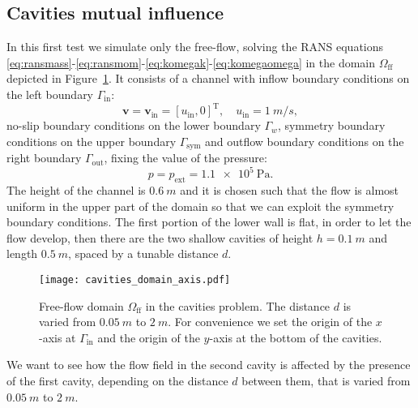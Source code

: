 \subsection{Cavities mutual influence}
In this first test we simulate only the free-flow, solving the RANS equations  \eqref{eq:ransmass}-\eqref{eq:ransmom}-\eqref{eq:komegak}-\eqref{eq:komegaomega} in the domain $\Omega_\text{ff}$ depicted in Figure~\ref{fig:singledomain}. It consists of a channel with inflow boundary 
conditions on the left boundary $\Gamma_\text{in}$:
\begin{equation}
	\mathbf{v} = \mathbf{v}_\text{in} = [u_\text{in}, 0]^\mathrm{T}, \quad u_\text{in} = \SI{1}{m/s},
\end{equation}
no-slip boundary conditions on the lower boundary $\Gamma_w$, symmetry boundary conditions on the upper boundary $\Gamma_\text{sym}$ and outflow boundary conditions on the right boundary $\Gamma_\text{out}$, fixing the value of the pressure:
\begin{equation}
	p = p_\text{ext} = \SI{1.1e5}{\pascal}.
\end{equation}
The height of the channel is $\SI{0.6}{m}$ and it is chosen such that the flow is almost uniform in the upper part of the domain so that we can exploit the symmetry boundary conditions. The first portion of the lower wall is flat, in order to let the flow develop, then there are the two shallow cavities of height $h=\SI{0.1}{m}$ and length $\SI{0.5}{m}$, spaced by a tunable distance $d$.
\begin{figure}[ht]
	\centering
	\texttt{[image: cavities\_domain\_axis.pdf]}
	\caption[Free-flow domain $\Omega_\text{ff}$ in the cavities problem]{Free-flow domain $\Omega_\text{ff}$ in the cavities problem. The distance $d$ is varied from $\SI{0.05}{m}$ to $\SI{2}{m}$. For convenience we set the origin of the $x$-axis at $\Gamma_\text{in}$ and the origin of the $y$-axis at the bottom of the cavities.}
	\label{fig:singledomain}
\end{figure}

We want to see how the flow field in the second cavity is affected by the 
presence of the first cavity, depending on the distance $d$ between them, that 
is varied from $\SI{0.05}{m}$ to $\SI{2}{m}$.

